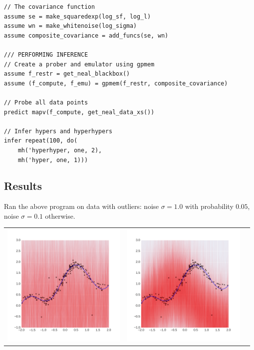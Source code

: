 \documentclass[a0,portrait]{a0poster}
\begin{document}
\begin{multicols}{3}
\begin{minipage}{\linewidth}
\begin{lstlisting}[frame=single,mathescape,label=alg:gphierarch,basicstyle=\fontsize{20}{22}\selectfont\ttfamily]
// The covariance function
assume se = make_squaredexp(log_sf, log_l)
assume wn = make_whitenoise(log_sigma)
assume composite_covariance = add_funcs(se, wn)

/// PERFORMING INFERENCE
// Create a prober and emulator using gpmem
assume f_restr = get_neal_blackbox()
assume (f_compute, f_emu) = gpmem(f_restr, composite_covariance)

// Probe all data points
predict mapv(f_compute, get_neal_data_xs())

// Infer hypers and hyperhypers
infer repeat(100, do(
    mh('hyperhyper, one, 2),
    mh('hyper, one, 1)))

\end{lstlisting}
\end{minipage}
\subsection*{Results}
Ran the above program on data with outliers: noise $\sigma = 1.0$ with probability $0.05$, noise $\sigma = 0.1$ otherwise.
\begin{center}
\begin{tabular}{ccc}
  \includegraphics[width=8cm]{neal_se_1final.png}&
  \includegraphics[width=8cm]{neal_se_2final.png}&

\end{tabular}
\end{center}
\end{multicols}
\end{document}
